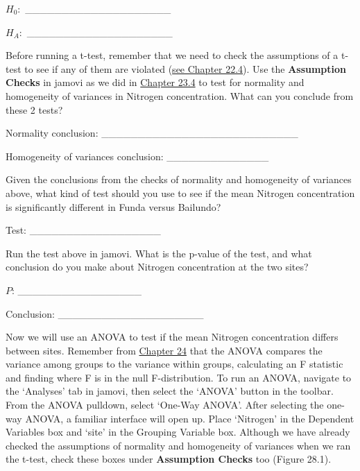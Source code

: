 \documentclass[
  openany]{krantz}
\begin{document}
\(H_{0}:\) \_\_\_\_\_\_\_\_\_\_\_\_\_\_\_\_\_\_\_\_

\(H_{A}:\) \_\_\_\_\_\_\_\_\_\_\_\_\_\_\_\_\_\_\_\_

Before running a t-test, remember that we need to check the assumptions of a t-test to see if any of them are violated (\protect\hyperlink{assumptions-of-t-tests}{see Chapter 22.4}).
Use the \textbf{Assumption Checks} in jamovi as we did in \protect\hyperlink{independent-samples-t-test-1}{Chapter 23.4} to test for normality and homogeneity of variances in Nitrogen concentration.
What can you conclude from these 2 tests?

Normality conclusion: \_\_\_\_\_\_\_\_\_\_\_\_\_\_\_\_\_\_\_\_\_\_\_\_\_\_\_

Homogeneity of variances conclusion: \_\_\_\_\_\_\_\_\_\_\_\_\_\_

Given the conclusions from the checks of normality and homogeneity of variances above, what kind of test should you use to see if the mean Nitrogen concentration is significantly different in Funda versus Bailundo?

Test: \_\_\_\_\_\_\_\_\_\_\_\_\_\_\_\_\_\_

Run the test above in jamovi.
What is the p-value of the test, and what conclusion do you make about Nitrogen concentration at the two sites?

\(P\): \_\_\_\_\_\_\_\_\_\_\_\_\_\_\_\_\_

Conclusion: \_\_\_\_\_\_\_\_\_\_\_\_\_\_\_\_\_\_\_\_

Now we will use an ANOVA to test if the mean Nitrogen concentration differs between sites.
Remember from \protect\hyperlink{Chapter_24}{Chapter 24} that the ANOVA compares the variance among groups to the variance within groups, calculating an F statistic and finding where F is in the null F-distribution.
To run an ANOVA, navigate to the `Analyses' tab in jamovi, then select the `ANOVA' button in the toolbar.
From the ANOVA pulldown, select `One-Way ANOVA'.
After selecting the one-way ANOVA, a familiar interface will open up.
Place `Nitrogen' in the Dependent Variables box and `site' in the Grouping Variable box.
Although we have already checked the assumptions of normality and homogeneity of variances when we ran the t-test, check these boxes under \textbf{Assumption Checks} too (Figure 28.1).
\end{document}

